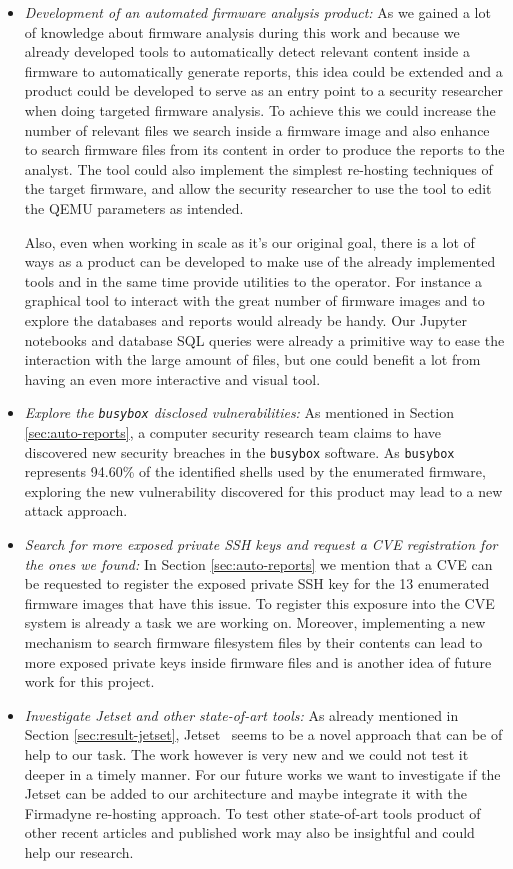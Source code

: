 \begin{itemize}
    \item \textit{Development of an automated firmware analysis product:} As we gained a lot of knowledge about firmware analysis during this work and because we already developed tools to automatically detect relevant content inside a firmware to automatically generate reports, this idea could be extended and a product could be developed to serve as an entry point to a security researcher when doing targeted firmware analysis. To achieve this we could increase the number of relevant files we search inside a firmware image and also enhance to search firmware files from its content in order to produce the reports to the analyst. The tool could also implement the simplest re-hosting techniques of the target firmware, and allow the security researcher to use the tool to edit the QEMU parameters as intended.
    
    Also, even when working in scale as it's our original goal, there is a lot of ways as a product can be developed to make use of the already implemented tools and in the same time provide utilities to the operator. For instance a graphical tool to interact with the great number of firmware images and to explore the databases and reports would already be handy. Our Jupyter notebooks and database SQL queries were already a primitive way to ease the interaction with the large amount of files, but one could benefit a lot from having an even more interactive and visual tool.
    
    \item \textit{Explore the {\tt busybox} disclosed vulnerabilities:} As mentioned in Section \ref{sec:auto-reports}, a computer security research team claims to have discovered new security breaches in the {\tt busybox} software. As {\tt busybox} represents 94.60\% of the identified shells used by the enumerated firmware, exploring the new vulnerability discovered for this product may lead to a new attack approach.
    
    \item \textit{Search for more exposed private SSH keys and request a CVE registration for the ones we found:} In Section \ref{sec:auto-reports} we mention that a CVE can be requested to register the exposed private SSH key for the 13 enumerated firmware images that have this issue. To register this exposure into the CVE system is already a task we are working on. Moreover, implementing a new mechanism to search firmware filesystem files by their contents can lead to more exposed private keys inside firmware files and is another idea of future work for this project.
    
    \item \textit{Investigate Jetset and other state-of-art tools:} As already mentioned in Section \ref{sec:result-jetset}, Jetset~\cite{jetset} seems to be a novel approach that can be of help to our task. The work however is very new and we could not test it deeper in a timely manner. For our future works we want to investigate if the Jetset can be added to our architecture and maybe integrate it with the Firmadyne re-hosting approach. To test other state-of-art tools product of other recent articles and published work may also be insightful and could help our research.
\end{itemize}